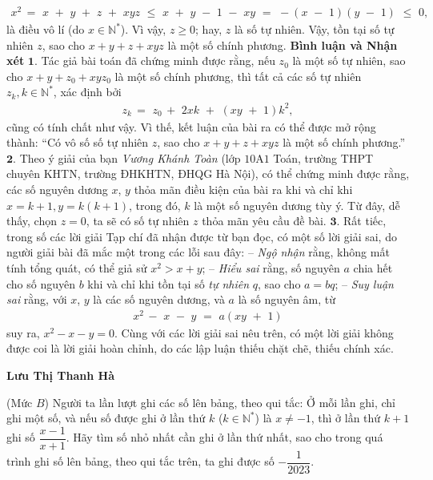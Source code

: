 \begin{multicols}{2}
\begin{align*}
		{x^2}\, = \,\,x\,\, + \,\,y\,\, + \,\,z\,\, + \,\,xyz\,\, \le \,\,x\,\, + \,\,y\,\, - \,\,1\,\, - \,\,xy\,\, = \,\, - \left( {x\,\, - \,\,1} \right)\left( {y\,\, - \,\,1} \right)\,\, \le \,\,0,
	\end{align*}
	là điều vô lí (do  $x \in \mathbb{N^*}$).
	\vskip 0.05cm
	Vì vậy, $z \ge 0$; hay, $z$ là số tự nhiên.
	\vskip 0.05cm
	Vậy, tồn tại số tự nhiên $z$, sao cho $x + y + z + xyz$ là một số chính phương.
	\vskip 0.05cm
	\textbf{Bình luận và Nhận xét}
	\vskip 0.05cm
	$\pmb{1.}$ Tác giả bài toán đã chứng minh được rằng, nếu $z_0$  là một số tự nhiên, sao cho $x + y + z_0 + xyz_0$  là một số chính phương, thì tất cả các số tự nhiên $z_k, k \in \mathbb{N^*}$, xác định bởi
	\begin{align*}
		{z_k}\, = \,\,{z_0}\, + \,\,2xk\,\, + \,\,\left( {xy\,\, + \,\,1} \right){k^2},
	\end{align*}
	cũng có tính chất như vậy. Vì thế, kết luận của bài ra có thể được mở rộng thành: “Có vô số số tự nhiên $z$, sao cho $x + y + z + xyz$ là một số chính phương.”
	\vskip 0.05cm
	$\pmb{2.}$ Theo ý giải của bạn \textit{Vương Khánh Toàn} (lớp $10$A$1$ Toán, trường THPT chuyên KHTN, trường ĐHKHTN, ĐHQG Hà Nội), có thể chứng minh được rằng, các số nguyên dương $x$, $y$ thỏa mãn điều kiện của bài ra khi và chỉ khi $x = k + 1, y = k(k + 1)$, trong đó, $k$ là một số nguyên dương tùy ý. Từ đây, dễ thấy, chọn $z = 0$, ta sẽ có số tự nhiên $z$ thỏa mãn yêu cầu đề bài.
	\vskip 0.05cm
	$\pmb{3.}$ Rất tiếc, trong số các lời giải Tạp chí đã nhận được từ bạn đọc, có một số lời giải sai, do người giải bài đã mắc một trong các lỗi sau đây:
	\vskip 0.05cm
	-- \textit{Ngộ nhận} rằng, không mất tính tổng quát, có thể giả sử $x^2 > x + y$;
	\vskip 0.05cm 
	-- \textit{Hiểu sai} rằng, số nguyên $a$ chia hết cho số nguyên $b$ khi và chỉ khi tồn tại số \textit{tự nhiên} $q$, sao cho $a = bq$;
	\vskip 0.05cm
	--\textit{ Suy luận sai} rằng, với $x$, $y$ là các số nguyên dương, và $a$ là số nguyên âm, từ
	\begin{align*}
		{x^2}\, - \,\,x\,\, - \,\,y\,\, = \,\,a\left( {xy\,\, + \,\,1} \right)
	\end{align*}
	suy ra, $x^2 - x - y = 0$.
	\vskip 0.05cm  
	Cùng với các lời giải sai nêu trên, có một lời giải không được coi là lời giải hoàn chỉnh, do các lập luận thiếu chặt chẽ, thiếu chính xác.
	\begin{flushright}
		\textbf{Lưu Thị Thanh Hà}
	\end{flushright}
	{}
	(Mức $B$)
	Người ta lần lượt ghi các số lên bảng, theo qui tắc: Ở mỗi lần ghi, chỉ ghi một số, và nếu số được ghi ở lần thứ $k$ ($k \in \mathbb{N^*}$) là $x \ne -1$,  thì ở lần thứ $k + 1$ ghi số $\dfrac{x-1}{x+1}$. Hãy tìm số nhỏ nhất cần ghi ở lần thứ nhất, sao cho trong quá trình ghi số lên bảng, theo qui tắc trên, ta ghi được số $-\dfrac{1}{2023}$.

\end{multicols}

